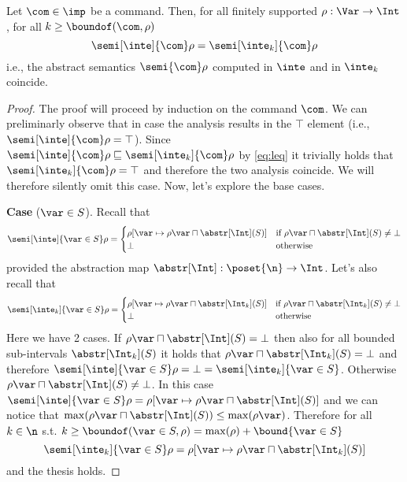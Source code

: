 \begin{lemma}
  Let \(\com\in \imp\) be a command. Then, for all finitely supported
  \(\rho : \Var \to \Int\), for all \(k\geq \boundof(\com,\rho)\)
  \begin{equation*}
    \semi[\inte]{\com}\rho = \semi[\inte_k]{\com}\rho
  \end{equation*}
  i.e., the abstract semantics \(\semi{\com} \rho\)
  computed in \(\inte\) and in \(\inte_k\) coincide.
\end{lemma}

\begin{proof}

  The proof will proceed by induction on the command \(\com\). We can
  preliminarly observe that in case the analysis results in the
  \(\top\) element (i.e., \({\semi[\inte]{\com}\rho = \top}\)).  Since
  \(\semi[\inte]{\com}\rho \sqsubseteq \semi[\inte_k]{\com}\rho\) by
  \eqref{eq:leq} it trivially holds that
  \(\semi[\inte_k]{\com}\rho = \top\) and therefore the two analysis
  coincide. We will therefore silently omit this case.  Now, let's
  explore the base cases.

  \medskip
  
  \noindent
  \textbf{Case} (\(\var \in S\)).
  Recall that
  \begin{equation*}
    \semi[\inte]{\var \in S}\rho = \begin{cases}
      \rho[\var \mapsto \rho\var \sqcap \abstr[\Int](S)] & \text{if } \rho\var \sqcap \abstr[\Int](S) \neq \bot \\
      \bot & \text{otherwise}
    \end{cases}
  \end{equation*}
  provided the abstraction map
  \({\abstr[\Int] : \poset{\n} \to \Int}\). Let's also recall that
  \begin{equation*}
    \semi[\inte_k]{\var \in S}\rho = \begin{cases}
      \rho[\var \mapsto \rho\var \sqcap \abstr[\Int_k](S)] & \text{if } \rho\var \sqcap \abstr[\Int_k](S) \neq \bot \\
      \bot & \text{otherwise}
    \end{cases}
  \end{equation*}
  Here we have 2 cases. If
  \({\rho\var \sqcap \abstr[\Int](S) = \bot}\) then also for all
  bounded sub-intervals \(\abstr[\Int_k](S)\) it holds that
  \({\rho\var \sqcap \abstr[\Int_k](S) = \bot}\) and therefore
  \({\semi[\inte]{\var\in S}\rho = \bot = \semi[\inte_k]{\var \in
      S}}\). Otherwise
  \({\rho\var \sqcap \abstr[\Int](S) \neq \bot}\). In this case
  \({\semi[\inte]{\var \in S}\rho = \rho[\var \mapsto \rho\var \sqcap
    \abstr[\Int](S)]}\) and we can notice that
  \(\max(\rho\var \sqcap \abstr[\Int](S)) \leq
  \max(\rho\var)\). Therefore for all \(k\in\n\) s.t.
  \({k\geq \boundof(\var \in S, \rho) = \max(\rho) + \bound{\var\in
      S}}\)
  \begin{equation*}
    \semi[\inte_k]{\var \in S}\rho = \rho[\var \mapsto \rho\var \sqcap \abstr[\Int_k](S)]
  \end{equation*}
  and the thesis holds.


\end{proof}
